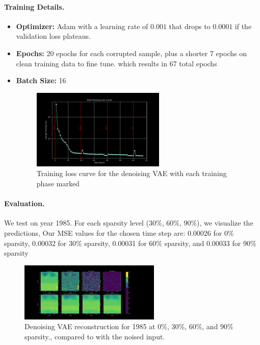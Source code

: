 \documentclass{article}
\begin{document}
\paragraph{Training Details.}
\begin{itemize}
    \item \textbf{Optimizer:} Adam with a learning rate of \(0.001\) that drops to \(0.0001\) if the validation loss plateaus.
    \item \textbf{Epochs:} 20 epochs for each corrupted sample, plus a shorter 7 epochs on clean training data to fine tune. which results in 67 total epochs
    \item \textbf{Batch Size:} 16
    \begin{figure}[ht]
        \centering
        \includegraphics[width=0.6\textwidth]{../loss/full_loss_curve20250320-223912.png}
        \caption{Training loss curve for the denoising VAE with each training phase marked}
        \label{fig:vae_loss}
    \end{figure}
\end{itemize}

\paragraph{Evaluation.}
We test on year 1985. For each sparsity level (30\%, 60\%, 90\%), we visualize the predictions, Our MSE values for the chosen time step are: 0.00026 for 0\% sparsity, 0.00032 for 30\% sparsity, 0.00031 for 60\% sparsity, and 0.00033 for 90\% sparsity

\begin{figure}[h]
    \centering
    \includegraphics[width=0.6\textwidth]{../plots/reconstruction_comparison20250320-223912.png}
    \caption{Denoising VAE reconstruction for 1985 at 0\%, 30\%, 60\%, and 90\% sparsity., compared to with the noised input.}
    \label{fig:vae_preds}
\end{figure}
\end{document}
